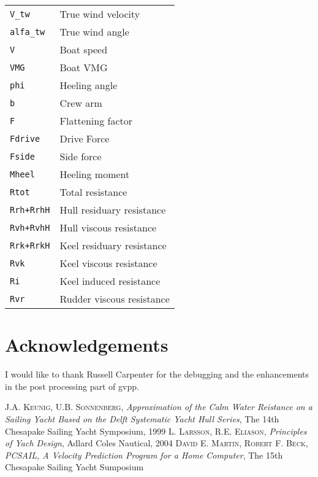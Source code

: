 \documentclass[a4paper,openany]{memoir}
\begin{document}
\begin{table}[h]
  \centering
  \begin{tabular}{l l}
    \texttt{V\_tw}		&True wind velocity\\
    \texttt{alfa\_tw}	&True wind angle\\
    \texttt{V}		&Boat speed\\
    \texttt{VMG}		&Boat VMG\\
    \texttt{phi}		&Heeling angle\\
    \texttt{b}		&Crew arm\\
    \texttt{F}		&Flattening factor\\
    \texttt{Fdrive}		&Drive Force\\
    \texttt{Fside}		&Side force\\
    \texttt{Mheel}		&Heeling moment\\
    \texttt{Rtot}		&Total resistance\\
    \texttt{Rrh+RrhH}	&Hull residuary resistance\\
    \texttt{Rvh+RvhH}	&Hull viscous resistance\\
    \texttt{Rrk+RrkH}	&Keel residuary resistance\\
    \texttt{Rvk}		&Keel viscous resistance\\
    \texttt{Ri}		&Keel induced resistance\\
    \texttt{Rvr}		&Rudder viscous resistance\\
  \end{tabular}
\end{table}

\chapter*{Acknowledgements}
I would like to thank Russell Carpenter for the debugging and the enhancements in the post processing part of gvpp.
\begin{thebibliography}{9}
   	\textsc{J.A. Keunig, U.B. Sonnenberg}, \textit{Approximation of the Calm Water Reistance on a Sailing Yacht Based on the Delft Systematic Yacht Hull Series}, The 14th Chesapake Sailing Yacht Symposium, 1999
   		\textsc{L. Larsson, R.E. Eliason}, \textit{Principles of Yach Design}, Adlard Coles Nautical, 2004
   	\textsc{David E. Martin, Robert F. Beck}, \textit{PCSAIL, A Velocity Prediction Program for a Home Computer}, The 15th Chesapake Sailing Yacht Sumposium
\end{thebibliography}
\end{document}
